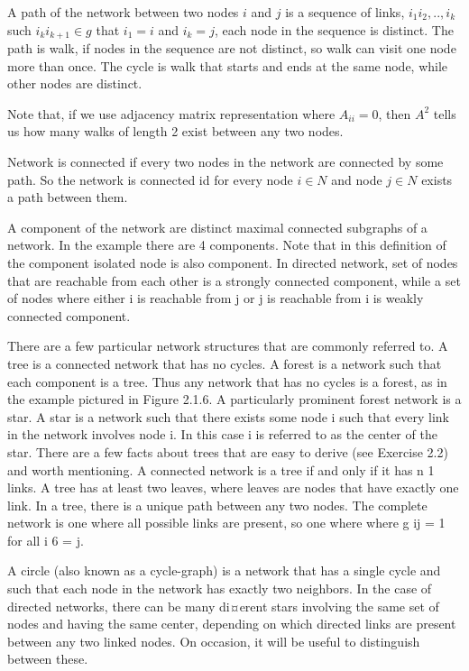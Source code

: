A path of the network between two nodes $i$ and $j$ is a sequence of links, $i_1i_2,..,i_k$ such $i_ki_{k+1} \in g$ that $i_1=i$ and $i_k=j$, each node in the sequence is distinct. 
The path is walk, if nodes in the sequence are not distinct, so walk can visit one node more than once. The cycle is walk that starts and ends at the same node, while other nodes are distinct. 

Note that, if we use adjacency matrix representation where $A_{ii}=0$, then $A^2$ tells us how many walks of length 2 exist between any two nodes.

Network is connected if every two nodes in the network are connected by some path. So the network is connected id for every node $i \in N$ and node $j \in N$ exists a path between them. 

A component of the network are distinct maximal connected subgraphs of a network. In the example there are 4 components. Note that in this definition of the component isolated node is also component. In directed network, set of nodes that are reachable from each other is a strongly connected component, while a set of nodes where either i is reachable from j or j is reachable from i is weakly connected component.

There are a few particular network structures that are commonly referred to.
A tree is a connected network that has no cycles.
A forest is a network such that each component is a tree. Thus any network that
has no cycles is a forest, as in the example pictured in Figure 2.1.6.
A particularly prominent forest network is a star. A star is a network such that
there exists some node i such that every link in the network involves node i. In this
case i is referred to as the center of the star.
There are a few facts about trees that are easy to derive (see Exercise 2.2) and
worth mentioning.
A connected network is a tree if and only if it has n
1 links.
A tree has at least two leaves, where leaves are nodes that have exactly one link.
In a tree, there is a unique path between any two nodes.
The complete network is one where all possible links are present, so one where
where g ij = 1 for all i 6 = j.

A circle (also known as a cycle-graph) is a network that has a single cycle and such
that each node in the network has exactly two neighbors.
In the case of directed networks, there can be many di¤erent stars involving the
same set of nodes and having the same center, depending on which directed links are
present between any two linked nodes. On occasion, it will be useful to distinguish
between these.

